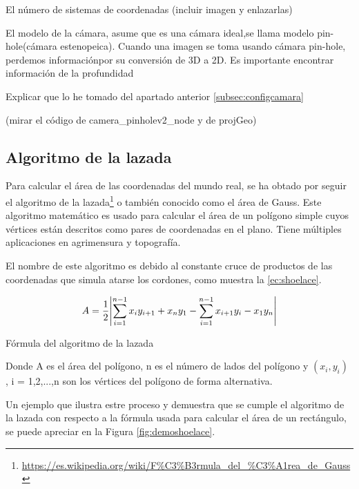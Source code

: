 El número de sistemas de coordenadas (incluir imagen y enlazarlas)

El modelo de la cámara, asume que es una cámara ideal,se llama modelo pin-hole(cámara estenopeica). Cuando una imagen se toma usando cámara pin-hole, perdemos informaciónpor su conversión de 3D a 2D. Es importante encontrar información de la profundidad




Explicar que lo he tomado del apartado anterior \ref{subsec:configcamara}
 
(mirar el código de camera\_pinholev2\_node y de projGeo)
\subsection{Algoritmo de la lazada}
\label{subsec:softwareshoelace}

Para calcular el área de las coordenadas del mundo real, se ha obtado por seguir el algoritmo de la lazada\footnote{\url{https://es.wikipedia.org/wiki/F\%C3\%B3rmula_del_\%C3\%A1rea_de_Gauss}} o también conocido como el área de Gauss. Este algoritmo matemático es usado para calcular el área de un polígono simple cuyos vértices están descritos como pares de coordenadas en el plano. Tiene múltiples aplicaciones en agrimensura y topografía.

El nombre de este algoritmo es debido al constante cruce de productos de las coordenadas que simula atarse los cordones, como muestra la \ref{ec:shoelace}.
\begin{myequation}[h]
	\begin{equation}
		A = \frac{1}{2}\abs{\sum_{i=1}^{n-1}x_i y_{i+1} + x_n y_1 - \sum_{i=1}^{n-1}x_{i+1} y_{i} - x_1 y_n}
		\nonumber
		\label{ec:shoelace}
	\end{equation}
	\caption[Fórmula del algoritmo de la lazada]{Fórmula del algoritmo de la lazada}
\end{myequation} 

Donde A es el área del polígono, n es el número de lados del polígono y $(x_i, y_i)$ , i = 1,2,...,n son los vértices del polígono de forma alternativa.

Un ejemplo que ilustra estre proceso y demuestra que se cumple el algoritmo de la lazada con respecto a la fórmula usada para calcular el área de un rectángulo, se puede apreciar en la Figura \ref{fig:demoshoelace}.


